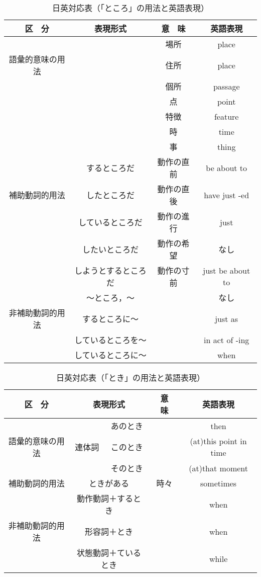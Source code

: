 \begin{table}[htbp]
\caption{日英対応表（「ところ」の用法と英語表現）}
\begin{center}
\begin{tabular}{|c|c|c|c|} \hline
区　分 & 表現形式 & 意　味 & 英語表現\\ \hline
 & & 場所 & place\\ \cline{3-4}
語彙的意味の用法 &  & 住所 & place\\ \cline{3-4}
 & & 個所 & passage\\ \cline{3-4}
 & & 点 & point\\ \cline{3-4}
 & & 特徴 & feature\\ \cline{3-4}
 & & 時 & time\\ \cline{3-4}
 & & 事 & thing\\ \hline
 & するところだ & 動作の直前 & be about to\\ \cline{2-4}
補助動詞的用法 & したところだ & 動作の直後 & have just -ed\\ \cline{2-4}
 & しているところだ & 動作の進行 & just\\ \cline{2-4}
 & したいところだ & 動作の希望 & なし\\ \cline{2-4}
 & しようとするところだ & 動作の寸前 & just be about to\\ \hline
 & 〜ところ，〜 & & なし\\ \cline{2-2} \cline{4-4}
非補助動詞的用法 & するところに〜 & & just as\\ \cline{2-2} \cline{4-4}
 & しているところを〜 & & in act of -ing\\ \cline{2-2} \cline{4-4}
 & しているところに〜 & & when\\ \hline
\end{tabular}
\end{center}
\end{table}

\begin{table}[htbp]
\caption{日英対応表（「とき」の用法と英語表現）}
\begin{center}
\begin{tabular}{|c|c|c|c|c|} \hline
区　分 & \multicolumn{2}{|c|}{表現形式} & 意　味 & 英語表現\\ \hline
 & & あのとき & & then\\ \cline{3-3} \cline{5-5}
語彙的意味の用法 & 連体詞 & このとき & & (at)this point in time\\ \cline{3-3} \cline{5-5}
 & & そのとき & & (at)that moment\\ \hline
補助動詞的用法 & \multicolumn{2}{|c|}{ときがある} &  時々 &  sometimes\\ \hline
 & \multicolumn{2}{|c|}{動作動詞＋するとき} & & when\\ \cline{2-3} \cline{5-5}
非補助動詞的用法 & \multicolumn{2}{|c|}{形容詞＋とき} & & when\\ \cline{2-3} \cline{5-5}
 & \multicolumn{2}{|c|}{状態動詞＋ているとき} & & while\\ \hline
\end{tabular}
\end{center}
\end{table}

